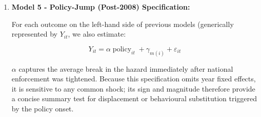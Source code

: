 \documentclass[12pt]{article}
\begin{document}
\begin{enumerate}
    In the full sample of all fines, we examine:

    \begin{equation}
        \operatorname{defor-arson}_{it} = \sum_{k \neq 2008} \phi_k \mathbf{1}\left[\operatorname{target-min-year_i}=k\right] + \gamma_{m(i)} + \varepsilon_{it}
    \end{equation}

    \(\phi_k\) tracks shifts in the share of fines related to deforestation and arson relative to 2008.
    
    \item \textbf{Model 5 - Policy-Jump (Post-2008) Specification:}

    For each outcome on the left-hand side of previous models (generically represented by \(Y_{it}\), we also estimate:

    \begin{equation}
        Y_{it} = \alpha \operatorname{policy}_{it} + \gamma_{m(i)} + \varepsilon_{it}
    \end{equation}

    \(\alpha\) captures the average break in the hazard immediately after national enforcement was tightened. Because this specification omits year fixed effects, it is sensitive to any common shock; its sign and magnitude therefore provide a concise summary test for displacement or behavioural substitution triggered by the policy onset.


\end{enumerate}
\end{document}
